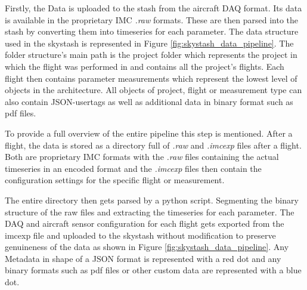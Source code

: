 Firstly, the Data is uploaded to the stash from the aircraft DAQ format. Its data is available in the proprietary IMC \textit{.raw} formats. These are then parsed into the stash by converting them into timeseries for each parameter. The data structure used in the skystash is represented in Figure \ref{fig:skystash_data_pipeline}. The folder structure's main path is the project folder which represents the project in which the flight was performed in and contains all the project's flights. Each flight then contains parameter measurements which represent the lowest level of objects in the architecture. All objects of project, flight or measurement type can also contain JSON-usertags as well as additional data in binary format such as pdf files.




To provide a full overview of the entire pipeline this step is mentioned. After a flight, the data is stored as a directory full of \textit{.raw} and \textit{.imcexp} files after a flight. Both are proprietary IMC formats with the \textit{.raw} files containing the actual timeseries in an encoded format and the \textit{.imcexp} files then contain the configuration settings for the specific flight or measurement.

The entire directory then gets parsed by a python script. Segmenting the binary structure of the raw files and extracting the timeseries for each parameter. The DAQ and aircraft sensor configuration for each flight gets exported from the imcexp file and uploaded to the skystash without modification to preserve genuineness of the data as shown in Figure \ref{fig:skystash_data_pipeline}. Any Metadata in shape of a JSON format is represented with a red dot and any binary formats such as pdf files or other custom data are represented with a blue dot.

